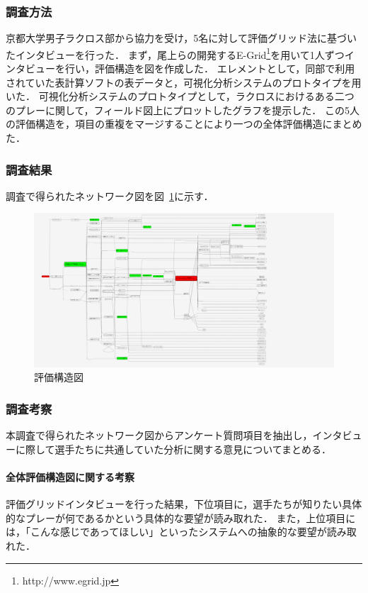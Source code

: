 \documentclass[sotsuron]{kuee}
\begin{document}
			\subsubsection{調査方法}
				京都大学男子ラクロス部から協力を受け，5名に対して評価グリッド法に基づいたインタビューを行った．
				まず，尾上らの開発するE-Grid\footnote{http://www.egrid.jp}を用いて1人ずつインタビューを行い，評価構造を図を作成した．
				エレメントとして，同部で利用されていた表計算ソフトの表データと，可視化分析システムのプロトタイプを用いた．
				可視化分析システムのプロトタイプとして，ラクロスにおけるある二つのプレーに関して，フィールド図上にプロットしたグラフを提示した．
				この5人の評価構造を，項目の重複をマージすることにより一つの全体評価構造にまとめた．
			\subsubsection{調査結果}	
				調査で得られたネットワーク図を図~\ref{fig:egrid}に示す．
					\begin{figure}
						\begin{center}
							\includegraphics[width=\linewidth,angle=90]{./png/egrid.png}
						\end{center}
						\caption{評価構造図}
				  		\label{fig:egrid}
					\end{figure}
			\subsubsection{調査考察}
				本調査で得られたネットワーク図からアンケート質問項目を抽出し，インタビューに際して選手たちに共通していた分析に関する意見についてまとめる．
				\paragraph{全体評価構造図に関する考察}
					評価グリッドインタビューを行った結果，下位項目に，選手たちが知りたい具体的なプレーが何であるかという具体的な要望が読み取れた．
					また，上位項目には，「こんな感じであってほしい」といったシステムへの抽象的な要望が読み取れた．
\end{document}
